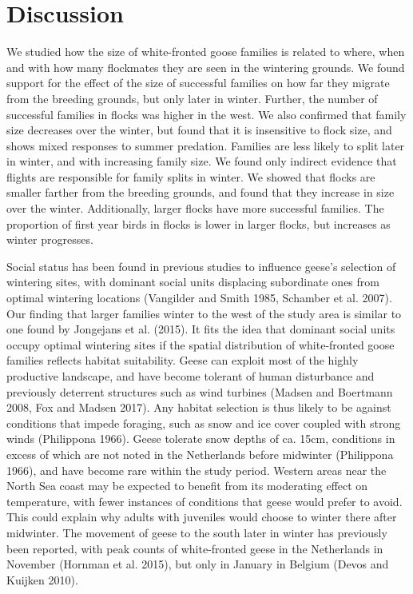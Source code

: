 \documentclass[10pt,twocolumn]{paper}
\begin{document}
\section{Discussion}\label{discussion}

We studied how the size of white-fronted goose families is related to
where, when and with how many flockmates they are seen in the wintering
grounds. We found support for the effect of the size of successful
families on how far they migrate from the breeding grounds, but only
later in winter. Further, the number of successful families in flocks
was higher in the west. We also confirmed that family size decreases
over the winter, but found that it is insensitive to flock size, and
shows mixed responses to summer predation. Families are less likely to
split later in winter, and with increasing family size. We found only
indirect evidence that flights are responsible for family splits in
winter. We showed that flocks are smaller farther from the breeding
grounds, and found that they increase in size over the winter.
Additionally, larger flocks have more successful families. The
proportion of first year birds in flocks is lower in larger flocks, but
increases as winter progresses.

Social status has been found in previous studies to influence geese's
selection of wintering sites, with dominant social units displacing
subordinate ones from optimal wintering locations (Vangilder and Smith
1985, Schamber et al. 2007). Our finding that larger families winter to
the west of the study area is similar to one found by Jongejans et al.
(2015). It fits the idea that dominant social units occupy optimal
wintering sites if the spatial distribution of white-fronted goose
families reflects habitat suitability. Geese can exploit most of the
highly productive landscape, and have become tolerant of human
disturbance and previously deterrent structures such as wind turbines
(Madsen and Boertmann 2008, Fox and Madsen 2017). Any habitat selection
is thus likely to be against conditions that impede foraging, such as
snow and ice cover coupled with strong winds (Philippona 1966). Geese
tolerate snow depths of ca. 15cm, conditions in excess of which are not
noted in the Netherlands before midwinter (Philippona 1966), and have
become rare within the study period. Western areas near the North Sea
coast may be expected to benefit from its moderating effect on
temperature, with fewer instances of conditions that geese would prefer
to avoid. This could explain why adults with juveniles would choose to
winter there after midwinter. The movement of geese to the south later
in winter has previously been reported, with peak counts of
white-fronted geese in the Netherlands in November (Hornman et al.
2015), but only in January in Belgium (Devos and Kuijken 2010).
\end{document}
